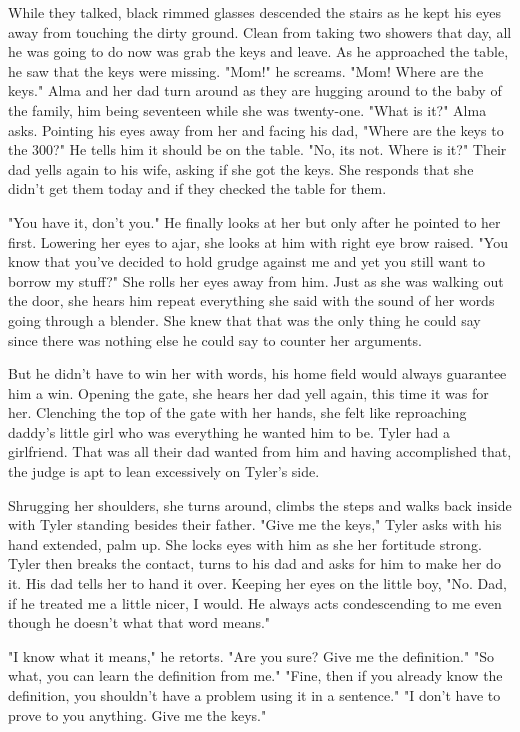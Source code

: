\begin{Document}
        While they talked, black rimmed glasses descended the stairs as he kept his eyes away from touching the dirty ground. Clean from taking
    two showers that day, all he was going to do now was grab the keys and leave. As he approached the table, he saw that the keys were missing.
    "Mom!" he screams. "Mom! Where are the keys." Alma and her dad turn around as they are hugging around to the baby of the family, him being
    seventeen while she was twenty-one. "What is it?" Alma asks. Pointing his eyes away from her and facing his dad, "Where are the keys to the
    300?" He tells him it should be on the table. "No, its not. Where is it?" Their dad yells again to his wife, asking if she got the keys. She
    responds that she didn't get them today and if they checked the table for them.

        "You have it, don't you." He finally looks at her but only after he pointed to her first. Lowering her eyes to ajar, she looks at him with
    right eye brow raised. "You know that you've decided to hold grudge against me and yet you still want to borrow my stuff?" She rolls her eyes
    away from him. Just as she was walking out the door, she hears him repeat everything she said with the sound of her words going through a 
    blender. She knew that that was the only thing he could say since there was nothing else he could say to counter her arguments.

        But he didn't have to win her with words, his home field would always guarantee him a win. Opening the gate, she hears her dad yell again,
    this time it was for her. Clenching the top of the gate with her hands, she felt like reproaching daddy's little girl who was everything he
    wanted him to be. Tyler had a girlfriend. That was all their dad wanted from him and having accomplished that, the judge is apt to lean excessively
    on Tyler's side.

        Shrugging her shoulders, she turns around, climbs the steps and walks back inside with Tyler standing besides their father. "Give me the keys,"
    Tyler asks with his hand extended, palm up. She locks eyes with him as she her fortitude strong. Tyler then breaks the contact, turns to his dad
    and asks for him to make her do it. His dad tells her to hand it over. Keeping her eyes on the little boy, "No. Dad, if he treated me a little
    nicer, I would. He always acts condescending to me even though he doesn't what that word means."

        "I know what it means," he retorts. "Are you sure? Give me the definition." "So what, you can learn the definition from me." "Fine, then if
    you already know the definition, you shouldn't have a problem using it in a sentence." "I don't have to prove to you anything. Give me the keys."


\end{Document}
